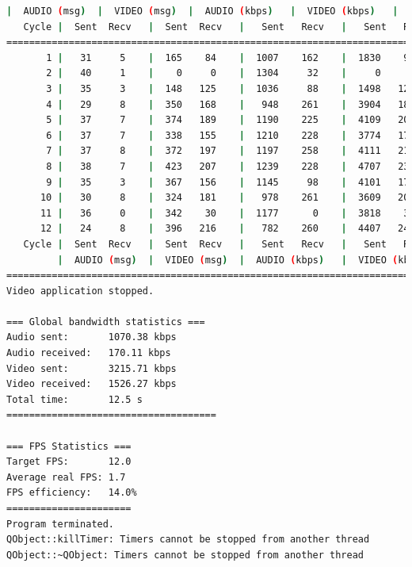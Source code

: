 \begin{lstlisting}[language=bash,basicstyle=\ttfamily\tiny]
         |  AUDIO (msg)  |  VIDEO (msg)  |  AUDIO (kbps)   |  VIDEO (kbps)   |     CPU (%) 
   Cycle |  Sent  Recv   |  Sent  Recv   |   Sent   Recv   |   Sent   Recv   | Program System
================================================================================================
       1 |   31     5    |  165    84    |  1007    162    |  1830    932    |  27      0       
       2 |   40     1    |    0     0    |  1304     32    |     0      0    |  46     75       
       3 |   35     3    |  148   125    |  1036     88    |  1498   1265    |  35     75       
       4 |   29     8    |  350   168    |   948    261    |  3904   1872    |  27     69       
       5 |   37     7    |  374   189    |  1190    225    |  4109   2074    |  45     65       
       6 |   37     7    |  338   155    |  1210    228    |  3774   1728    |  38     71       
       7 |   37     8    |  372   197    |  1197    258    |  4111   2179    |  45     74       
       8 |   38     7    |  423   207    |  1239    228    |  4707   2304    |  41     67       
       9 |   35     3    |  367   156    |  1145     98    |  4101   1741    |  43     67       
      10 |   30     8    |  324   181    |   978    261    |  3609   2018    |  48     66       
      11 |   36     0    |  342    30    |  1177      0    |  3818    335    |  53     72       
      12 |   24     8    |  396   216    |   782    260    |  4407   2406    |  37     69       
   Cycle |  Sent  Recv   |  Sent  Recv   |   Sent   Recv   |   Sent   Recv   | Program System
         |  AUDIO (msg)  |  VIDEO (msg)  |  AUDIO (kbps)   |  VIDEO (kbps)   |     CPU (%) 
===========================================================================================
Video application stopped.

=== Global bandwidth statistics ===
Audio sent:       1070.38 kbps
Audio received:   170.11 kbps
Video sent:       3215.71 kbps
Video received:   1526.27 kbps
Total time:       12.5 s
=====================================

=== FPS Statistics ===
Target FPS:       12.0
Average real FPS: 1.7
FPS efficiency:   14.0%
======================
Program terminated.
QObject::killTimer: Timers cannot be stopped from another thread
QObject::~QObject: Timers cannot be stopped from another thread
\end{lstlisting}

